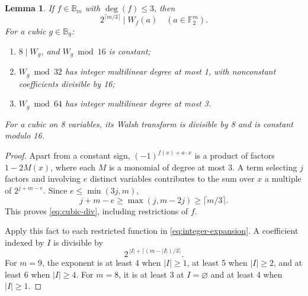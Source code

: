 \documentclass[11pt]{article}
\newtheorem{lemma}{Lemma}
\newtheorem{open problem}{Open problem}
\begin{document}
\begin{lemma}\label{lem:divisibility}
If $f\in \mathbb{B}_m$ with $\deg(f)\le 3$, then
\begin{equation}\label{eq:cubic-div}
2^{\lceil m/3\rceil}\mid W_f(a)\quad(a\in \mathbb{F}_2^m).
\end{equation}
For a cubic $g\in \mathbb{B}_9$:
\begin{enumerate}
\item $8\mid W_g$, and $W_g\bmod16$ is constant;
\item $W_g\bmod32$ has integer multilinear degree at most 1, with nonconstant coefficients divisible by 16;
\item $W_g\bmod64$ has integer multilinear degree at most 3.
\end{enumerate}
For a cubic on 8 variables, its Walsh transform is divisible by 8 and is constant modulo 16.
\end{lemma}
\begin{proof}
Apart from a constant sign, $(-1)^{f(x)+a\cdot x}$ is a product of factors $1-2M(x)$, where each $M$ is a monomial of degree at most 3. A term selecting $j$ factors and involving $e$ distinct variables contributes to the sum over $x$ a multiple of $2^{j+m-e}$. Since $e\le\min(3j,m)$,
\[
j+m-e\ge\max(j,m-2j)\ge\lceil m/3\rceil.
\]
This proves \eqref{eq:cubic-div}, including restrictions of $f$.

Apply this fact to each restricted function in \eqref{eq:integer-expansion}. A coefficient indexed by $I$ is divisible by
\begin{equation}\label{eq:coefficient-div}
2^{\,|I|+\lceil(m-|I|)/3\rceil}.
\end{equation}
For $m=9$, the exponent is at least 4 when $|I|\ge1$, at least 5 when $|I|\ge2$, and at least 6 when $|I|\ge4$. For $m=8$, it is at least 3 at $I=\varnothing$ and at least 4 when $|I|\ge1$.
\end{proof}
\end{document}

